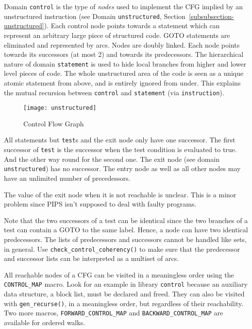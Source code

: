 \documentclass[a4paper]{article}
\begin{document}
{}


Domain \verb/control/ is the type of \emph{nodes} used to implement the
CFG implied by an unstructured instruction (see Domain
\verb/unstructured/, Section~\ref{subsubsection-unstructured}). Each
control node points towards a statement which can represent an arbitrary
large piece of structured code. GOTO statements are eliminated and
represented by arcs. Nodes are doubly linked. Each node points towards
its successors (at most 2) and towards its predecessors. The
hierarchical nature of domain \verb/statement/ is used to hide local
branches from higher and lower level pieces of code. The whole
unstructured area of the code is seen as a unique atomic statement from
above, and is entirely ignored from under. This explains the mutual
recursion between \verb/control/ and \verb/statement/ (via
\verb/instruction/).

\begin{figure}
\begin{center}
\mbox{\texttt{[image: unstructured]}}
\end{center}
\caption{Control Flow Graph}
\label{figure-unstructured}
\end{figure}

All statements but \verb/test/s and the exit node only have one
successor. The first successor of \verb/test/ is the successor when the
test condition is evaluated to true.  And the other way round for the
second one. The exit node (see domain \verb/unstructured/) has no
successor. The entry node as well as all other nodes may have an
unlimited number of precedessors.

The value of the exit node when it is not reachable is unclear. This is
a minor problem since PIPS isn't supposed to deal with faulty programs.

Note that the two successors of a test can be identical since the two
branches of a test can contain a GOTO to the same label. Hence, a node can
have two identical predecessors. The lists of predecessors and successors
cannot be handled like sets, in general. Use
\verb/check_control_coherency()/ to make sure that the predecessor and
successor lists can be interpreted as a multiset of arcs.

All reachable nodes of a CFG can be visited in a meaningless order using
the \verb/CONTROL_MAP/ macro. Look for an example in library
\verb/control/ because an auxiliary data structure, a block list, must be
declared and freed. They can also be visited with \verb/gen_recurse()/, in
a meaningless order, but regardless of their reachability. Two more
macros, \verb/FORWARD_CONTROL_MAP/ and \verb/BACKWARD_CONTROL_MAP/ are
available for ordered walks.
\end{document}
